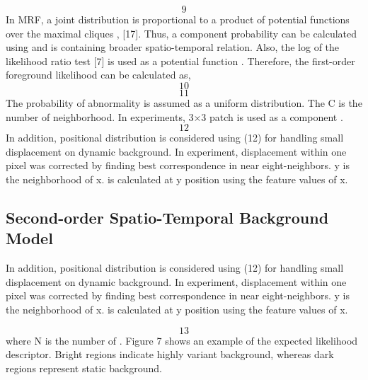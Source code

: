 \documentclass[a4paper,twocolumn, 10pt]{article}
\begin{document}
\begin{equation}
  9
\end{equation}
In MRF, a joint distribution   is proportional to a product of potential functions   over the maximal cliques  , [17]. Thus, a component probability   can be calculated using   and is containing broader spatio-temporal relation. Also, the log of the likelihood ratio test [7] is used as a potential function  . Therefore, the first-order foreground likelihood   can be calculated as,
\begin{equation}
  10
\end{equation}
\begin{equation}
  11
\end{equation}
The probability of abnormality   is assumed as a uniform distribution. The C is the number of neighborhood. In experiments, 3×3 patch is used as a component  . 
\begin{equation}
  12
\end{equation}
In addition, positional distribution is considered using (12) for handling small displacement on dynamic background. In experiment, displacement within one pixel was corrected by finding best correspondence in near eight-neighbors. y is the neighborhood of x.   is calculated at y position using the feature values of x.


\subsection{Second-order Spatio-Temporal Background Model}
In addition, positional distribution is considered using (12) for handling small displacement on dynamic background. In experiment, displacement within one pixel was corrected by finding best correspondence in near eight-neighbors. y is the neighborhood of x.   is calculated at y position using the feature values of x.

\begin{equation}
  13
\end{equation}
where N is the number of  . Figure 7 shows an example of the expected likelihood descriptor. Bright regions indicate highly variant background, whereas dark regions represent static background.
\end{document}
